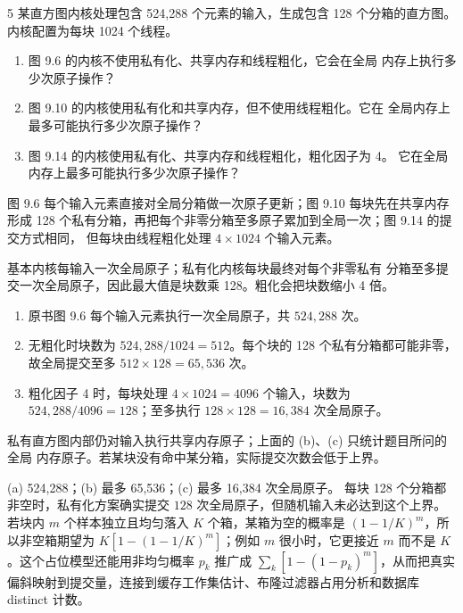 \begin{solutionexercise}{5}
\problemheading 某直方图内核处理包含 524,288 个元素的输入，生成包含 128 个分箱的直方图。
内核配置为每块 1024 个线程。
\begin{enumerate}[label=\alph*.,leftmargin=2.2em]
  \item 图 9.6 的内核不使用私有化、共享内存和线程粗化，它会在全局
  内存上执行多少次原子操作？
  \item 图 9.10 的内核使用私有化和共享内存，但不使用线程粗化。它在
  全局内存上最多可能执行多少次原子操作？
  \item 图 9.14 的内核使用私有化、共享内存和线程粗化，粗化因子为 4。
  它在全局内存上最多可能执行多少次原子操作？
\end{enumerate}
图 9.6 每个输入元素直接对全局分箱做一次原子更新；图 9.10 每块先在共享内存形成
128 个私有分箱，再把每个非零分箱至多原子累加到全局一次；图 9.14 的提交方式相同，
但每块由线程粗化处理 $4\times1024$ 个输入元素。

\approachheading 基本内核每输入一次全局原子；私有化内核每块最终对每个非零私有
分箱至多提交一次全局原子，因此最大值是块数乘 128。粗化会把块数缩小 4 倍。

\answerheading
\begin{enumerate}[label=\alph*.,leftmargin=2.2em]
\item 原书图 9.6 每个输入元素执行一次全局原子，共
$524{,}288$ 次。
\item 无粗化时块数为 $524{,}288/1024=512$。每个块的 128 个私有分箱都可能非零，
故全局提交至多 $512\times128=65{,}536$ 次。
\item 粗化因子 4 时，每块处理 $4\times1024=4096$ 个输入，块数为
$524{,}288/4096=128$；至多执行 $128\times128=16{,}384$ 次全局原子。
\end{enumerate}
私有直方图内部仍对输入执行共享内存原子；上面的 (b)、(c) 只统计题目所问的全局
内存原子。若某块没有命中某分箱，实际提交次数会低于上界。

\conclusionheading (a) 524,288；(b) 最多 65,536；(c) 最多 16,384 次全局原子。
\discussionheading
{}每块 128 个分箱都非空时，私有化方案确实提交 $128$ 次全局原子，但随机输入未必达到这个上界。若块内 $m$ 个样本独立且均匀落入 $K$ 个箱，某箱为空的概率是 $(1-1/K)^m$，所以非空箱期望为 $K[1-(1-1/K)^m]$；例如 $m$ 很小时，它更接近 $m$ 而不是 $K$。这个占位模型还能用非均匀概率 $p_k$ 推广成 $\sum_k[1-(1-p_k)^m]$，从而把真实偏斜映射到提交量，连接到缓存工作集估计、布隆过滤器占用分析和数据库 distinct 计数。


\end{solutionexercise}
